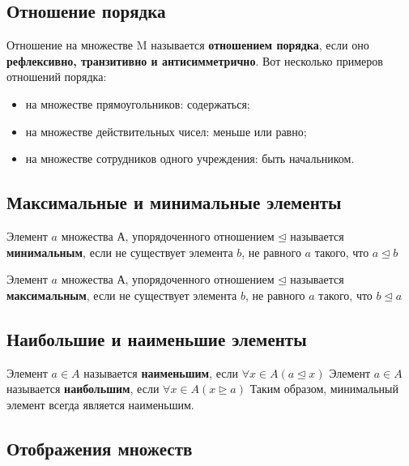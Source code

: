 \documentclass[a4paper]{article}
\begin{document}
    \subsection*{Отношение порядка}
    Отношение на множестве M называется \textbf{отношением
    порядка}, если оно \textbf{рефлексивно, транзитивно и антисимметрично}.
    Вот несколько примеров отношений порядка:
    \begin{itemize}
        \item на множестве прямоугольников: содержаться;
        \item на множестве действительных чисел: меньше или равно;
        \item на множестве сотрудников одного учреждения: быть начальником.
    \end{itemize}

    \subsection*{Максимальные и минимальные элементы}
    Элемент $a$ множества $А$, упорядоченного отношением $\unlhd$ называется \textbf{минимальным}, если не существует элемента $b$, не равного $a$ такого, что $a \unlhd b$\newline

    Элемент $a$ множества $А$, упорядоченного отношением $\unlhd$ называется \textbf{максимальным}, если не существует элемента $b$, не равного $a$ такого, что $b \unlhd a$

    \subsection*{Наибольшие и наименьшие элементы
    }
    Элемент $a \in A$ называется \textbf{наименьшим}, если $\forall x \in A (a \unlhd x)$\newline
    Элемент $a \in A$ называется \textbf{наибольшим}, если $\forall x \in A (x \unrhd a)$\newline
    Таким образом, минимальный элемент всегда является наименьшим.

    \newpage \begin{center}
                 \begin{Large}
                 \end{Large}
    \end{center}

    \subsection*{Отображения множеств
    }
\end{document}
